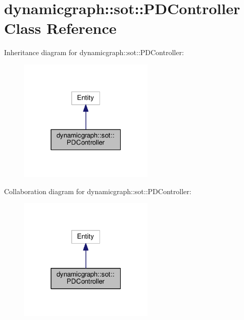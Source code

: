 \hypertarget{classdynamicgraph_1_1sot_1_1PDController}{}\section{dynamicgraph\+:\+:sot\+:\+:P\+D\+Controller Class Reference}
\label{classdynamicgraph_1_1sot_1_1PDController}


Inheritance diagram for dynamicgraph\+:\+:sot\+:\+:P\+D\+Controller\+:
\nopagebreak
\begin{figure}[H]
\begin{center}
\leavevmode
\includegraphics[width=183pt]{classdynamicgraph_1_1sot_1_1PDController__inherit__graph}
\end{center}
\end{figure}


Collaboration diagram for dynamicgraph\+:\+:sot\+:\+:P\+D\+Controller\+:
\nopagebreak
\begin{figure}[H]
\begin{center}
\leavevmode
\includegraphics[width=183pt]{classdynamicgraph_1_1sot_1_1PDController__coll__graph}
\end{center}
\end{figure}
